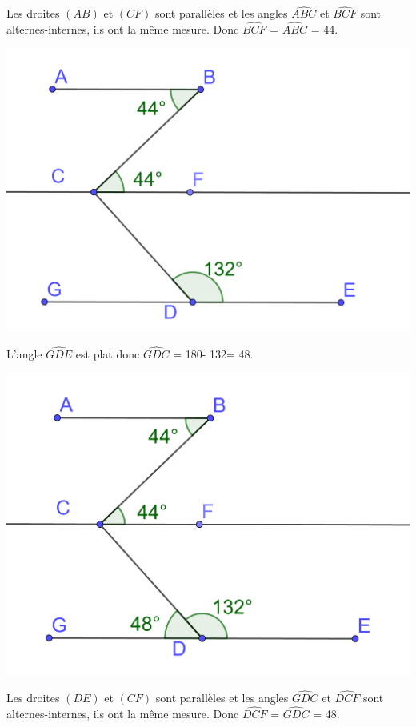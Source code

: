 \documentclass[12pt,a4paper]{article}
\begin{document}
Les droites $(AB)$ et $(CF)$ sont parallèles et les angles $\widehat{ABC}$ et $\widehat{BCF}$ sont alternes-internes, ils ont la même mesure. Donc $\widehat{BCF}$ = $\widehat{ABC}$ = 44\degree .

\begin{center}
	\includegraphics[scale=0.1]{ex37_3}
\end{center}

\newpage

L'angle $\widehat{GDE}$ est plat donc $\widehat{GDC}$ = 180\degree  - 132\degree = 48\degree .
\begin{center}
	\includegraphics[scale=0.1]{ex37_4}
\end{center}

Les droites $(DE)$ et $(CF)$ sont parallèles et les angles $\widehat{GDC}$ et $\widehat{DCF}$ sont alternes-internes, ils ont la même mesure. Donc $\widehat{DCF}$ = $\widehat{GDC}$ = 48\degree .
\end{document}
